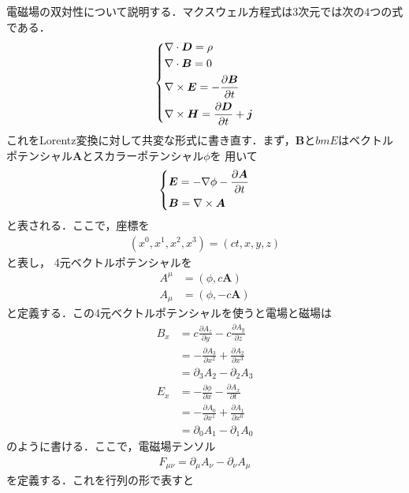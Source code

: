 \documentclass{report}
\begin{document}
  電磁場の双対性について説明する．マクスウェル方程式は3次元では次の4つの式である．
  \begin{align}
    \begin{dcases}
      \nabla \cdot \bm{D} = \rho \\
      \nabla \cdot \bm{B} = 0\\
      \nabla \times \bm{E} = - \frac{\partial \bm{B}}{\partial t}\\
      \nabla \times \bm{H} = \frac{\partial \bm{D}}{\partial t} + \bm{j}
    \end{dcases}
  \end{align}
  これをLorentz変換に対して共変な形式に書き直す．まず，$\bm{B}$と$bm{E}$はベクトルポテンシャル$\bm{A}$とスカラーポテンシャル$\phi$を
  用いて
  \begin{align}
    \begin{dcases}
      \bm{E} = -\nabla \phi - \frac{\partial \bm{A}}{\partial t}\\
      \bm{B} = \nabla \times \bm{A}
    \end{dcases}
  \end{align}
  と表される．ここで，座標を
  \begin{align}
    (x^0, x^1, x^2, x^3) = (ct, x, y, z)
  \end{align}
  と表し，
  4元ベクトルポテンシャルを
  \begin{align}
    A^{\mu} &= (\phi, c\bm{A})\\
    A_{\mu} &= (\phi, -c\bm{A})
  \end{align}
  と定義する．この4元ベクトルポテンシャルを使うと電場と磁場は
  \begin{align}
    B_x &= c \frac{\partial A_z}{\partial y} - c \frac{\partial A_y}{\partial z}\\
    &= -\frac{\partial A_3}{\partial x^2} + \frac{\partial A_2}{\partial x^3}\\
    &= \partial_3 A_2 - \partial_2 A_3\\
    E_x &= -\frac{\partial \phi}{\partial x} - \frac{\partial A_x}{\partial t}\\
    &= -\frac{\partial A_0}{\partial x^1} + \frac{\partial A_1}{\partial x^0}\\
    &= \partial_0 A_1 - \partial_1 A_0
  \end{align}
  のように書ける．ここで，電磁場テンソル
  \begin{align}
    F_{\mu\nu} = \partial_{\mu}A_\nu - \partial_\nu A_\mu
  \end{align}
  を定義する．これを行列の形で表すと
\end{document}
